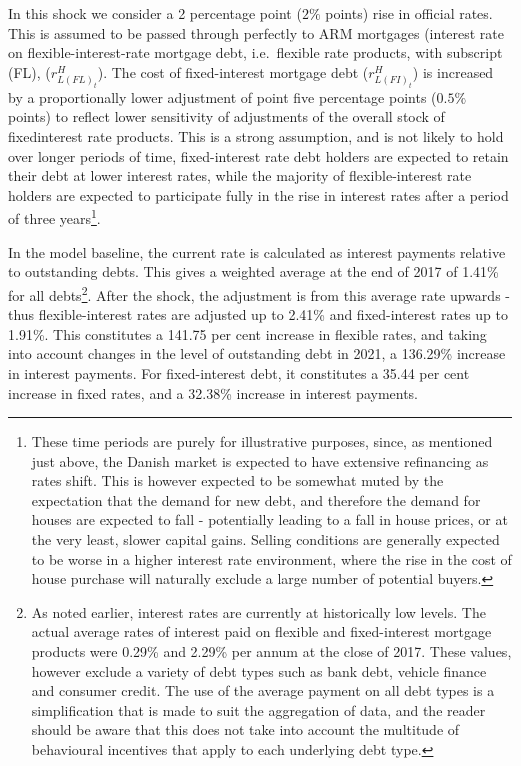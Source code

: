 \documentclass[
]{book}
\begin{document}
In this shock we consider a 2 percentage point (\(2\%\) points) rise in official rates. This is assumed to be passed through perfectly to ARM mortgages (interest rate on flexible-interest-rate mortgage debt, i.e.~flexible rate products, with subscript (FL), (\(r^H_{L(FL)_{t}}\)). The cost of fixed-interest mortgage debt (\(r^H_{L(FI)_{t}}\)) is increased by a proportionally lower adjustment of point five percentage points (\(0.5\%\) points) to reflect lower sensitivity of adjustments of the overall stock of fixedinterest rate products. This is a strong assumption, and is not likely to hold over longer periods of time, fixed-interest rate debt holders are expected to retain their debt at lower interest rates, while the majority of flexible-interest rate holders are expected to participate fully in the rise in interest rates after a period of three years\footnote{These time periods are purely for illustrative purposes, since, as mentioned just above, the Danish market is expected to have extensive refinancing as rates shift. This is however expected to be somewhat muted by the expectation that the demand for new debt, and therefore the demand for houses are expected to fall - potentially leading to a fall in house prices, or at the very least, slower capital gains. Selling conditions are generally expected to be worse in a higher interest rate environment, where the rise in the cost of house purchase will naturally exclude a large number of potential buyers.}.

In the model baseline, the current rate is calculated as interest payments relative to outstanding debts. This gives a weighted average at the end of 2017 of 1.41\% for all debts\footnote{As noted earlier, interest rates are currently at historically low levels. The actual average rates of interest paid on flexible and fixed-interest mortgage products were 0.29\% and 2.29\% per annum at the close of 2017. These values, however exclude a variety of debt types such as bank debt, vehicle finance and consumer credit. The use of the average payment on all debt types is a simplification that is made to suit the aggregation of data, and the reader should be aware that this does not take into account the multitude of behavioural incentives that apply to each underlying debt type.}. After the shock, the adjustment is from this average rate upwards - thus flexible-interest rates are adjusted up to 2.41\% and fixed-interest rates up to 1.91\%. This constitutes a 141.75 per cent increase in flexible rates, and taking into account changes in the level of outstanding debt in 2021, a 136.29\% increase in interest payments. For fixed-interest debt, it constitutes a 35.44 per cent increase in fixed rates, and a 32.38\% increase in interest payments.
\end{document}
